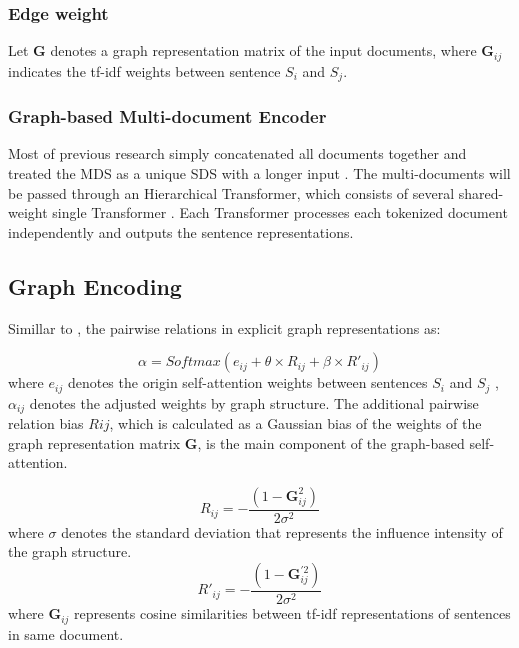 \documentclass[11pt]{article}
\begin{document}
\subsubsection{Edge weight}
Let $\mathbf{G}$ denotes a graph representation matrix of the input documents, where $\mathbf{G}_{ij}$  indicates the tf-idf weights between sentence $S_i$ and $S_j$.

\subsubsection{Graph-based Multi-document Encoder}
Most of previous research simply concatenated
all documents together and treated the MDS as
a unique SDS with a longer input \cite{jin2020multi, cao2017improving}. The multi-documents will be passed through an Hierarchical Transformer, which consists of several
shared-weight single Transformer \cite{vaswani2017attention}. Each Transformer processes each tokenized document independently and outputs the sentence representations.

\subsection{Graph Encoding}
Simillar to \cite{li-etal-2020-leveraging-graph}, the pairwise relations in explicit graph representations as: 

\begin{equation}
    \alpha = Softmax(e_{ij} + \theta \times R_{ij} + \beta \times R'_{ij})
\end{equation}
where $e_{ij}$ denotes the origin self-attention weights between sentences $S_i$ and $S_j$ , $\alpha_{ij}$ denotes the adjusted weights by graph structure. The additional pairwise relation bias $R{ij}$, which is calculated as a Gaussian bias of the weights of the graph representation matrix $\mathbf{G}$, is the main component of the graph-based self-attention.

\begin{equation}
     R_{ij} = -\frac{(1-\mathbf{G}_{ij}^2)}{2\sigma^2}
\end{equation}
where $\sigma$ denotes the standard deviation that represents the influence intensity of the graph structure. 
\begin{equation}
    R'_{ij} = -\frac{(1-\mathbf{G}_{ij}^{'2})}{2\sigma^2}
\end{equation}
where $\mathbf{G}_{ij}$ represents cosine similarities between tf-idf representations
of sentences in same document. 
\end{document}
